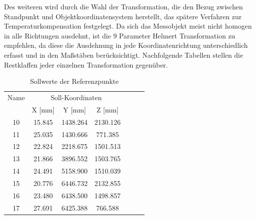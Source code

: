 Des weiteren wird durch die Wahl der Transformation, die den Bezug zwischen Standpunkt und Objektkoordinatensystem herstellt, das spätere Verfahren zur Temperaturkompensation festgelegt. Da sich das Messobjekt meist nicht homogen in alle Richtungen ausdehnt, ist die 9 Parameter Helmert Transformation zu empfehlen, da diese die Ausdehnung in jede Koordinatenrichtung unterschiedlich erfasst und in den Maßstäben berücksichtigt. Nachfolgende Tabellen stellen die Restklaffen jeder einzelnen Transformation gegenüber.

\begin{table}[H]
\centering
\caption{Sollwerte der Referenzpunkte}

\begin{tabular}{ccccccc}
\toprule
\multicolumn{1}{p{1.5cm}|}{Name} &
\multicolumn{3}{c}{Soll-Koordinaten} \\
\multicolumn{1}{p{2cm}|}{} &
\multicolumn{1}{p{2cm}|}{X [mm]} &
\multicolumn{1}{p{2cm}|}{Y [mm]} &
\multicolumn{1}{p{2cm}}{Z [mm]} \\
\midrule

\multicolumn{1}{p{2cm}|}{10} &
\multicolumn{1}{p{2cm}|}{15.845} &
\multicolumn{1}{p{2cm}|}{1438.264} &
\multicolumn{1}{p{2cm}}{2130.126} \\

\multicolumn{1}{p{2cm}|}{11} &
\multicolumn{1}{p{2cm}|}{25.035} &
\multicolumn{1}{p{2cm}|}{1430.666} &
\multicolumn{1}{p{2cm}}{771.385} \\

\multicolumn{1}{p{2cm}|}{12} &
\multicolumn{1}{p{2cm}|}{22.824} &
\multicolumn{1}{p{2cm}|}{2218.675} &
\multicolumn{1}{p{2cm}}{1501.513} \\

\multicolumn{1}{p{2cm}|}{13} &
\multicolumn{1}{p{2cm}|}{21.866} &
\multicolumn{1}{p{2cm}|}{3896.552} &
\multicolumn{1}{p{2cm}}{1503.765} \\

\multicolumn{1}{p{2cm}|}{14} &
\multicolumn{1}{p{2cm}|}{24.491} &
\multicolumn{1}{p{2cm}|}{5158.900} &
\multicolumn{1}{p{2cm}}{1510.039} \\

\multicolumn{1}{p{2cm}|}{15} &
\multicolumn{1}{p{2cm}|}{20.776} &
\multicolumn{1}{p{2cm}|}{6446.732} &
\multicolumn{1}{p{2cm}}{2132.855} \\

\multicolumn{1}{p{2cm}|}{16} &
\multicolumn{1}{p{2cm}|}{23.480} &
\multicolumn{1}{p{2cm}|}{6438.500} &
\multicolumn{1}{p{2cm}}{1498.857} \\

\multicolumn{1}{p{2cm}|}{17} &
\multicolumn{1}{p{2cm}|}{27.691} &
\multicolumn{1}{p{2cm}|}{6425.388} &
\multicolumn{1}{p{2cm}}{766.588} \\

\bottomrule
\end{tabular}
\end{table}

